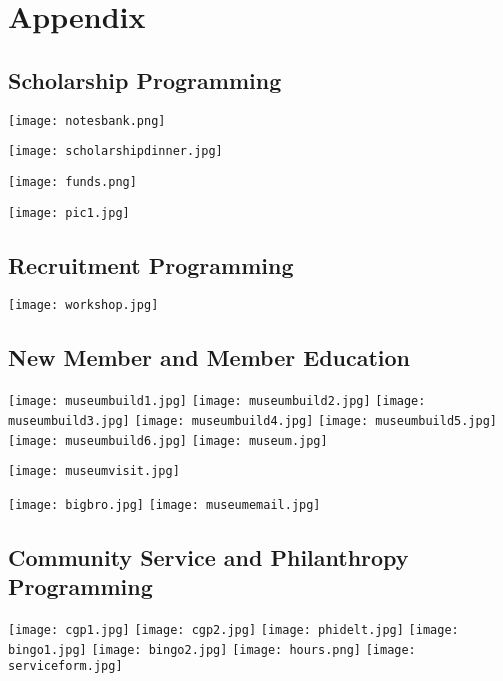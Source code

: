 \chapter{Appendix}

  \section{Scholarship Programming}
    \texttt{[image: notesbank.png]}
    
    \texttt{[image: scholarshipdinner.jpg]}
    
    \texttt{[image: funds.png]}
    
    
    \texttt{[image: pic1.jpg]}

    
  \section{Recruitment Programming}
    
    
    
    \texttt{[image: workshop.jpg]}
  
  \section{New Member and Member Education}
    \texttt{[image: museumbuild1.jpg]}
    \texttt{[image: museumbuild2.jpg]}
    \texttt{[image: museumbuild3.jpg]}
    \texttt{[image: museumbuild4.jpg]}
    \texttt{[image: museumbuild5.jpg]}
    \texttt{[image: museumbuild6.jpg]}
    \texttt{[image: museum.jpg]} \vspace{2.5cm}
    
    
    \texttt{[image: museumvisit.jpg]}

    
    \texttt{[image: bigbro.jpg]}
    \texttt{[image: museumemail.jpg]}
    
    
    
    
    
    
    
    
    
  \section{Community Service and Philanthropy Programming}
    
    \texttt{[image: cgp1.jpg]}
    \texttt{[image: cgp2.jpg]}
    \texttt{[image: phidelt.jpg]}
    \texttt{[image: bingo1.jpg]}
    \texttt{[image: bingo2.jpg]}
    \texttt{[image: hours.png]}
    \texttt{[image: serviceform.jpg]}
  

